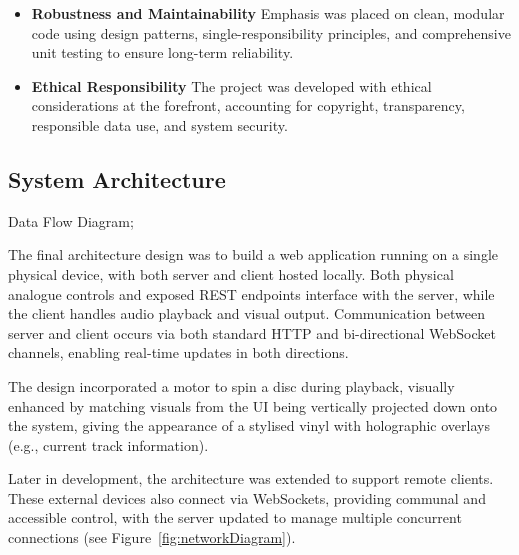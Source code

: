             \begin{itemize}
                \item \textbf{Robustness and Maintainability} Emphasis was placed on clean, modular code using design patterns, single-responsibility principles, and comprehensive unit testing to ensure long-term reliability.
            \end{itemize}
    
            \begin{itemize}
                \item \textbf{Ethical Responsibility} The project was developed with ethical considerations at the forefront, accounting for copyright, transparency, responsible data use, and system security.
            \end{itemize}
        
        \subsection{System Architecture} %
    
            \begin{temp}               
                
                Data Flow Diagram;
            \end{temp}
    
            The final architecture design was to build a web application running on a single physical device, with both server and client hosted locally. Both physical analogue controls and exposed REST endpoints interface with the server, while the client handles audio playback and visual output. Communication between server and client occurs via both standard HTTP and bi-directional WebSocket channels, enabling real-time updates in both directions.
    
            The design incorporated a motor to spin a disc during playback, visually enhanced by matching visuals from the UI being vertically projected down onto the system, giving the appearance of a stylised vinyl with holographic overlays (e.g., current track information).
    
            Later in development, the architecture was extended to support remote clients. These external devices also connect via WebSockets, providing communal and accessible control, with the server updated to manage multiple concurrent connections (see Figure~\ref{fig:networkDiagram}).
        
